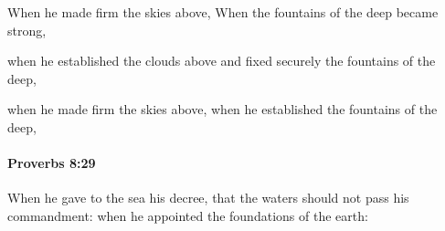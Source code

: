 			\begin{versebox}
					\item[BHS] 
					\item[ASV] When he made firm the skies above, When the fountains of the deep became strong,
					\item[NIV] when he established the clouds above and fixed securely the fountains of the deep,
					\item[NRSV] when he made firm the skies above, when he established the fountains of the deep,
			\end{versebox}

		\paragraph{Proverbs 8:29} %
			\label{PROVERBS-8-29}

			When he gave to the sea his decree, that the waters should not pass his commandment: when he appointed the foundations of the earth:

